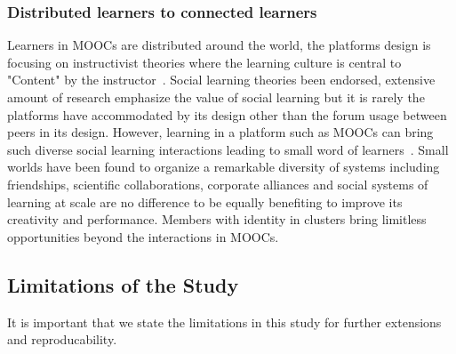 \documentclass[format=acmsmall, review=false, screen=true]{acmart}
\begin{document}
\subsubsection {Distributed learners to connected learners} 
Learners in MOOCs are distributed around the world, the platforms design is focusing on instructivist theories where the learning culture is central to "Content" by the instructor~\cite{crosslin2016instructivism}. Social learning theories been endorsed, extensive amount of research emphasize the value of social learning but it is rarely the platforms have accommodated by its design other than the forum usage between peers in its design. However, learning in a platform such as MOOCs can bring such diverse social learning interactions leading to small word of learners~\cite{watts1999networks}. Small worlds have been found to organize a remarkable diversity of systems including friendships, scientific collaborations, corporate alliances and social systems of learning at scale are no difference to be equally benefiting to improve its creativity and performance. Members with identity in clusters bring limitless opportunities beyond the interactions in MOOCs. 




\subsection{Limitations of the Study}
It is important that we state the limitations in this study for further extensions and reproducability. 
\end{document}
